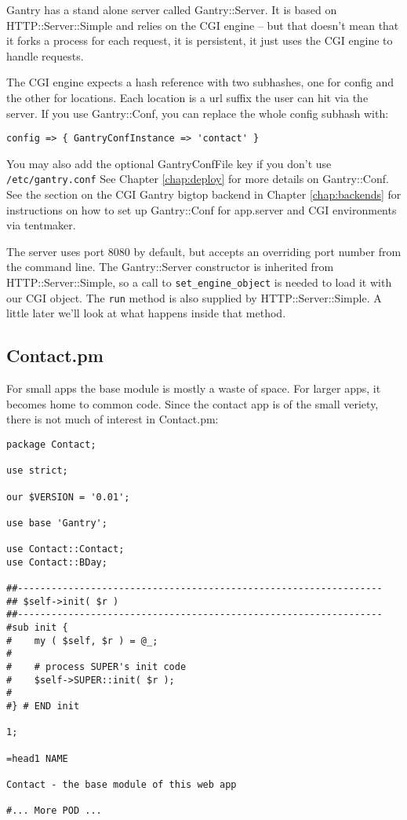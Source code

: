 Gantry has a stand alone server called Gantry::Server.  It is based on
HTTP::Server::Simple and relies on the CGI engine -- but that doesn't mean
that it forks a process for each request, it is persistent, it just uses
the CGI engine to handle requests.

The CGI engine expects a hash reference with two subhashes, one for config
and the other for locations.  Each location is a url suffix the user can
hit via the server.  If you use Gantry::Conf, you can replace the whole config
subhash with:
\begin{verbatim}
config => { GantryConfInstance => 'contact' }
\end{verbatim}
You may also add the optional GantryConfFile key if you don't use
\verb+/etc/gantry.conf+  See Chapter \ref{chap:deploy} for more details
on Gantry::Conf.  See the section on the CGI Gantry bigtop backend
in Chapter \ref{chap:backends} for instructions on how to set up Gantry::Conf
for app.server and CGI environments via tentmaker.

The server uses port 8080 by default, but accepts an overriding port number
from the command line.  The Gantry::Server constructor is inherited
from HTTP::Server::Simple, so a call to \verb+set_engine_object+ is needed
to load it with our CGI object.  The \verb+run+ method is also supplied
by HTTP::Server::Simple.  A little later we'll look at what happens inside that
method.

\subsection*{Contact.pm}

For small apps the base module is mostly a waste of space.  For larger apps,
it becomes home to common code.  Since the contact app is of the small
veriety, there is not much of interest in Contact.pm:

\begin{verbatim}
package Contact;

use strict;

our $VERSION = '0.01';

use base 'Gantry';

use Contact::Contact;
use Contact::BDay;

##-----------------------------------------------------------------
## $self->init( $r )
##-----------------------------------------------------------------
#sub init {
#    my ( $self, $r ) = @_;
#
#    # process SUPER's init code
#    $self->SUPER::init( $r );
#
#} # END init

1;

=head1 NAME

Contact - the base module of this web app

#... More POD ...
\end{verbatim}

